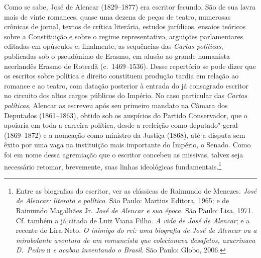 Como se sabe, José de Alencar (1829--1877) era escritor fecundo. São de
sua lavra mais de vinte romances, quase uma dezena de peças de teatro,
numerosas crônicas de jornal, textos de crítica literária, estudos
jurídicos, ensaios teóricos sobre a Constituição e sobre o regime
representativo, arguições parlamentares editadas em opúsculos e,
finalmente, as sequências das \textit{Cartas políticas}, publicadas sob
o pseudônimo de Erasmo, em alusão ao grande humanista neerlandês Erasmo
de Roterdã (c.~1469--1536). Desse repertório se pode dizer que os
escritos sobre política e direito constituem produção tardia em relação
ao romance e ao teatro, com datação posterior à  entrada do já
consagrado escritor no circuito dos altos cargos públicos do Império.
No caso particular das \textit{Cartas políticas}, Alencar as escreveu
após seu primeiro mandato na Câmara dos Deputados (1861--1863), obtido
sob os auspícios do Partido Conservador, que o apoiaria em toda a
carreira política, desde a reeleição como deputado"-geral
(1869--1872) e a nomeação como ministro da Justiça (1868), até a
disputa sem êxito por uma vaga na instituição mais importante do
Império, o Senado. Como foi em nome dessa agremiação que o escritor
concebeu as missivas, talvez seja necessário retomar, brevemente, suas
linhas ideológicas fundamentais.\footnote{ Entre as biografias do escritor, ver as clássicas de Raimundo de Menezes. 
\textit{José de Alencar: literato e político}. São Paulo: 
Martins Editora, 1965; e de Raimundo Magalhães Jr. \textit{José de Alencar e sua época}. São Paulo: Lisa, 1971. 
Cf. também a já citada de Luiz Viana Filho. \textit{A vida de José de Alencar}; e a recente de Lira Neto. 
\textit{O inimigo do rei: uma biografia de José de Alencar ou a mirabolante aventura de um romancista 
que colecionava desafetos, azucrinava D.~Pedro} \textsc{ii} \textit{e acabou inventando o Brasil}. São Paulo: Globo, 2006.} 

